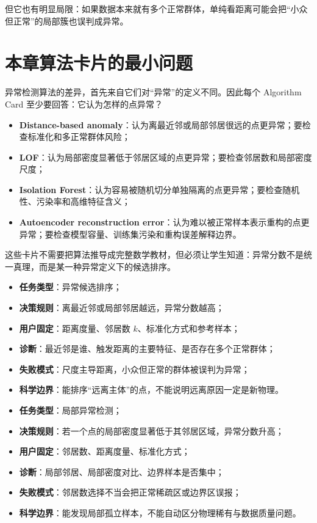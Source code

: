 但它也有明显局限：如果数据本来就有多个正常群体，单纯看距离可能会把“小众但正常”的局部簇也误判成异常。

\section{本章算法卡片的最小问题}

异常检测算法的差异，首先来自它们对“异常”的定义不同。因此每个 Algorithm Card 至少要回答：它认为怎样的点异常？

\begin{itemize}
    \item \textbf{Distance-based anomaly}：认为离最近邻或局部邻居很远的点更异常；要检查标准化和多正常群体风险；
    \item \textbf{LOF}：认为局部密度显著低于邻居区域的点更异常；要检查邻居数和局部密度尺度；
    \item \textbf{Isolation Forest}：认为容易被随机切分单独隔离的点更异常；要检查随机性、污染率和高维特征含义；
    \item \textbf{Autoencoder reconstruction error}：认为难以被正常样本表示重构的点更异常；要检查模型容量、训练集污染和重构误差解释边界。
\end{itemize}

这些卡片不需要把算法推导成完整数学教材，但必须让学生知道：异常分数不是统一真理，而是某一种异常定义下的候选排序。

\begin{examplebox}
\begin{itemize}
    \item \textbf{任务类型}：异常候选排序；
    \item \textbf{决策规则}：离最近邻或局部邻居越远，异常分数越高；
    \item \textbf{用户固定}：距离度量、邻居数 \(k\)、标准化方式和参考样本；
    \item \textbf{诊断}：最近邻是谁、触发距离的主要特征、是否存在多个正常群体；
    \item \textbf{失败模式}：尺度主导距离，小众但正常的群体被误判为异常；
    \item \textbf{科学边界}：能排序“远离主体”的点，不能说明远离原因一定是新物理。
\end{itemize}
\end{examplebox}

\begin{examplebox}
\begin{itemize}
    \item \textbf{任务类型}：局部异常检测；
    \item \textbf{决策规则}：若一个点的局部密度显著低于其邻居区域，异常分数升高；
    \item \textbf{用户固定}：邻居数、距离度量、标准化方式；
    \item \textbf{诊断}：局部邻居、局部密度对比、边界样本是否集中；
    \item \textbf{失败模式}：邻居数选择不当会把正常稀疏区或边界区误报；
    \item \textbf{科学边界}：能发现局部孤立样本，不能自动区分物理稀有与数据质量问题。
\end{itemize}
\end{examplebox}


